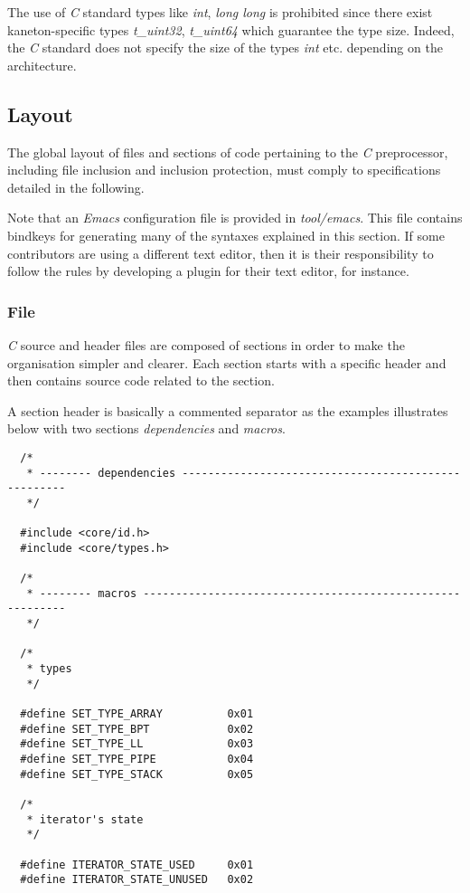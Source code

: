 The use of \textit{C} standard types like \textit{int}, \textit{long long}
is prohibited since there exist kaneton-specific types \textit{t\_uint32},
\textit{t\_uint64} which guarantee the type size. Indeed, the \textit{C}
standard does not specify the size of the types \textit{int} etc. depending
on the architecture.

%
%

\subsection{Layout}

The global layout of files and sections of code pertaining to the \textit{C}
preprocessor, including file inclusion and inclusion protection, must
comply to specifications detailed in the following.

Note that an \textit{Emacs} configuration file is provided in
\textit{tool/emacs}. This file contains bindkeys for generating many of
the syntaxes explained in this section. If some contributors are using
a different text editor, then it is their responsibility to follow the rules
by developing a plugin for their text editor, for instance.


\subsubsection{File}

\textit{C} source and header files are composed of sections in order to make
the organisation simpler and clearer. Each section starts with a specific
header and then contains source code related to the section.

A section header is basically a commented separator as the examples
illustrates below with two sections \textit{dependencies} and \textit{macros}.

\begin{verbatim}
  /*
   * -------- dependencies ----------------------------------------------------
   */

  #include <core/id.h>
  #include <core/types.h>

  /*
   * -------- macros ----------------------------------------------------------
   */

  /*
   * types
   */

  #define SET_TYPE_ARRAY          0x01
  #define SET_TYPE_BPT            0x02
  #define SET_TYPE_LL             0x03
  #define SET_TYPE_PIPE           0x04
  #define SET_TYPE_STACK          0x05

  /*
   * iterator's state
   */

  #define ITERATOR_STATE_USED     0x01
  #define ITERATOR_STATE_UNUSED   0x02
\end{verbatim}

